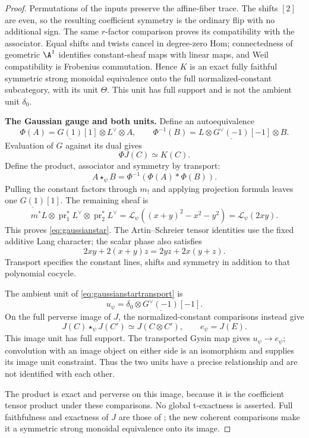 \begin{proof}
Permutations of the inputs preserve the affine-fiber trace.
The shifts $[2]$ are even, so the resulting coefficient
symmetry is the ordinary flip with no additional sign.
The same $r$-factor comparison proves its compatibility
with the associator.
Equal shifts and twists cancel in degree-zero Hom;
connectedness of geometric $\A^1$ identifies constant-sheaf
maps with linear maps, and Weil compatibility is Frobenius
commutation.
Hence $K$ is an exact fully faithful symmetric strong
monoidal equivalence onto the full normalized-constant
subcategory, with its unit $\Theta$.
This unit has full support and is not the ambient unit
$\delta_0$.

\par\smallskip\noindent\textbf{The Gaussian gauge and both units.}\quad
Define an autoequivalence
\[
 \Phi(A)=\underline{G(1)}[1]\otimes L^\vee\otimes A,
 \qquad
 \Phi^{-1}(B)=L\otimes\underline{G^\vee(-1)}[-1]\otimes B.
\]
Evaluation of $G$ against its dual gives
\[
 \Phi J(C)\simeq K(C).
\]
Define the product, associator and symmetry by transport:
\begin{equation}\label{eq:gaussianstartransport}
 A\star_\psi B=\Phi^{-1}(\Phi(A)*\Phi(B)).
\end{equation}
Pulling the constant factors through $m_!$ and applying
projection formula leaves one $\underline{G(1)}[1]$.
The remaining sheaf is
\[
 m^*L\otimes\operatorname{pr}_1^*L^\vee
          \otimes\operatorname{pr}_2^*L^\vee
 =\mathcal L_\psi((x+y)^2-x^2-y^2)
 =\mathcal L_\psi(2xy).
\]
This proves \eqref{eq:gaussianstar}.
The Artin--Schreier tensor identities use the fixed
additive Lang character; the scalar phase also satisfies
\[
 2xy+2(x+y)z=2yz+2x(y+z).
\]
Transport specifies the constant lines, shifts and symmetry
in addition to that polynomial cocycle.

The ambient unit of \eqref{eq:gaussianstartransport} is
\[
 u_\psi=\delta_0\otimes\underline{G^\vee(-1)}[-1].
\]
On the full perverse image of $J$, the normalized-constant
comparisons instead give
\[
 J(C)\star_\psi J(C')\simeq J(C\otimes C'),
 \qquad e_\psi=J(E).
\]
This image unit has full support. The transported Gysin
map gives $u_\psi\to e_\psi$; convolution with an image
object on either side is an isomorphism and supplies
its image unit constraint.
Thus the two units have a precise relationship and are
not identified with each other.

The product is exact and perverse on this image, because
it is the coefficient tensor product under these
comparisons. No global t-exactness is asserted.
Full faithfulness and exactness of $J$ are those of
; the new coherent comparisons make it a
symmetric strong monoidal equivalence onto its image.


\end{proof}
